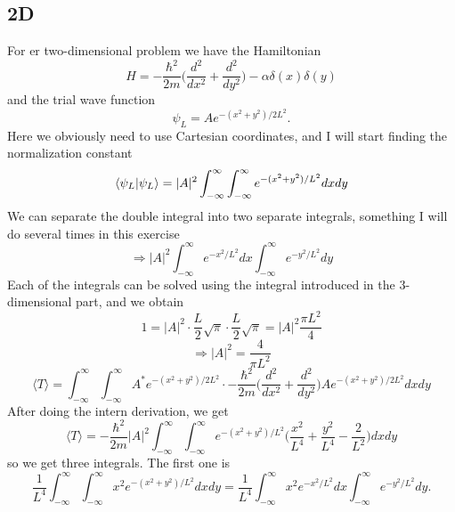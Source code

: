 \documentclass{scrartcl}
\begin{document}
\subsection*{2D}
For er two-dimensional problem we have the Hamiltonian
\begin{equation}
H=-\frac{\hbar^2}{2m}\bigg(\frac{d^2}{dx^2}+\frac{d^2}{dy^2}\bigg)-\alpha\delta(x)\delta(y)
\end{equation}
and the trial wave function
\begin{equation}
\psi_L=Ae^{-(x^2+y^2)/2L^2}.
\end{equation}
Here we obviously need to use Cartesian coordinates, and I will start finding the normalization constant
\begin{equation*}
\braket{\psi_L}{\psi_L}=|A|^2\int_{-\infty}^{\infty}\int_{-\infty}^{\infty} e^{-(x^2+y^2)/L^2}dxdy
\end{equation*}
We can separate the double integral into two separate integrals, something I will do several times in this exercise
\begin{equation*}
\Rightarrow |A|^2\int_{-\infty}^{\infty} e^{-x^2/L^2}dx\int_{-\infty}^{\infty} e^{-y^2/L^2}dy
\end{equation*}
Each of the integrals can be solved using the integral introduced in the 3-dimensional part, and we obtain
\begin{equation*}
1=|A|^2\cdot \frac{L}{2}\sqrt{\pi}\cdot \frac{L}{2}\sqrt{\pi}=|A|^2\frac{\pi L^2}{4}
\end{equation*}
\begin{equation}
\Rightarrow |A|^2=\frac{4}{\pi L^2}
\end{equation}
\begin{equation*}
\langle T\rangle =\int_{-\infty}^{\infty} \int_{-\infty}^{\infty}A^*e^{-(x^2+y^2)/2L^2}\cdot -\frac{\hbar^2}{2m}\bigg(\frac{d^2}{dx^2}+\frac{d^2}{dy^2}\bigg)Ae^{-(x^2+y^2)/2L^2}dxdy
\end{equation*}
After doing the intern derivation, we get
\begin{equation*}
\langle T\rangle = -\frac{\hbar^2}{2m}|A|^2\int_{-\infty}^{\infty}\int_{-\infty}^{\infty} e^{-(x^2+y^2)/L^2}\bigg(\frac{x^2}{L^4}+\frac{y^2}{L^4}-\frac{2}{L^2}\bigg)dxdy
\end{equation*}
so we get three integrals. The first one is
\begin{equation*}
\frac{1}{L^4}\int_{-\infty}^{\infty}\int_{-\infty}^{\infty} x^2e^{-(x^2+y^2)/L^2}dxdy=\frac{1}{L^4}\int_{-\infty}^{\infty} x^2e^{-x^2/L^2}dx\int_{-\infty}^{\infty} e^{-y^2/L^2}dy.
\end{equation*}
\end{document}
